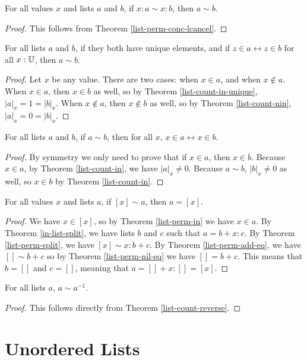 \documentclass[../math.tex]{subfiles}
\begin{document}
\begin{theorem} \label{list-perm-add-eq}
    For all values $x$ and lists $a$ and $b$, if $x : a \sim x : b$, then $a
    \sim b$.
\end{theorem}
\begin{proof}
    This follows from Theorem \ref{list-perm-conc-lcancel}.
\end{proof}

\begin{theorem} \label{list-in-unique-perm}
    For all lists $a$ and $b$, if they both have unique elements, and if $z \in
    a \leftrightarrow z \in b$ for all $x : \mathbb{U}$, then $a \sim b$.
\end{theorem}
\begin{proof}
    Let $x$ be any value.  There are two cases: when $x \in a$, and when $x
    \notin a$.  When $x \in a$, then $x \in b$ as well, so by Theorem
    \ref{list-count-in-unique}, $|a|_x = 1 = |b|_x$.  When $x \notin a$, then $x
    \notin b$ as well, so by Theorem \ref{list-count-nin}, $|a|_x = 0 = |b|_x$.
\end{proof}

\begin{theorem} \label{list-perm-in}
    For all lists $a$ and $b$, if $a \sim b$, then for all $x$, $x \in a
    \leftrightarrow x \in b$.
\end{theorem}
\begin{proof}
    By symmetry we only need to prove that if $x \in a$, then $x \in b$.
    Because $x \in a$, by Theorem \ref{list-count-in}, we have $|a|_x \neq 0$.
    Because $a \sim b$, $|b|_x \neq 0$ as well, so $x \in b$ by Theorem
    \ref{list-count-in}.
\end{proof}

\begin{theorem} \label{list-perm-single}
    For all values $x$ and lists $a$, if $[x] \sim a$, then $a = [x]$.
\end{theorem}
\begin{proof}
    We have $x \in [x]$, so by Theorem \ref{list-perm-in} we have $x \in a$.  By
    Theorem \ref{in-list-split}, we have lists $b$ and $c$ such that $a = b + x
    : c$.  By Theorem \ref{list-perm-split}, we have $[x] \sim x : b + c$.  By
    Theorem \ref{list-perm-add-eq}, we have $[] \sim b + c$ so by Theorem
    \ref{list-perm-nil-eq} we have $[] = b + c$.  This means that $b = []$ and
    $c = []$,  meaning that $a = [] + x : [] = [x]$.
\end{proof}

\begin{theorem} \label{list-perm-reverse}
    For all lists $a$, $a \sim a^{-1}$.
\end{theorem}
\begin{proof}
    This follows directly from Theorem \ref{list-count-reverse}.
\end{proof}

\section{Unordered Lists}
\end{document}

